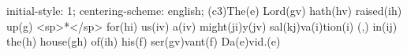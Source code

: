initial-style: 1;
centering-scheme: english;
(c3)The(e) Lord(gv) hath(hv) raised(ih) up(g) <sp>*</sp> for(hi) us(iv) a(iv) might(ji)y(jv) sal(kj)va(i)tion(i) (,) in(ij) the(h) house(gh) of(ih) his(f) ser(gv)vant(f) Da(e)vid.(e)
